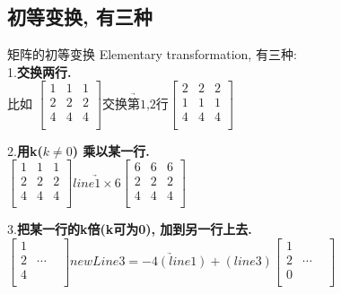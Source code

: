 \documentclass[UTF8]{ctexart}
\begin{document}
\subsection{初等变换, 有三种}

矩阵的初等变换 Elementary transformation, 有三种: \\

1.\textbf{交换两行.} \\
比如 $
\left[ \begin{matrix}
	1&		1&		1\\
	2&		2&		2\\
	4&		4&		4\\
\end{matrix} \right] \underrightarrow{\text{交换第1,2行}}\left[ \begin{matrix}
	2&		2&		2\\
	1&		1&		1\\
	4&		4&		4\\
\end{matrix} \right] 
$ \\
\vspace{1em} 

2.\textbf{用k($k \ne 0 $) 乘以某一行.} \\
$
\left[ \begin{matrix}
	1&		1&		1\\
	2&		2&		2\\
	4&		4&		4\\
\end{matrix} \right] \underrightarrow{line1 ×6}\left[ \begin{matrix}
	6&		6&		6\\
	2&		2&		2\\
	4&		4&		4\\
\end{matrix} \right] 
$ \\
\vspace{1em} 

3.\textbf{把某一行的k倍(k可为0), 加到另一行上去.} \\
$
\left[ \begin{matrix}
	1&		&		\\
	2&		\cdots&		\\
	4&		&		\\
\end{matrix} \right] \underrightarrow{newLine3=-4(line1)+(line3)}\left[ \begin{matrix}
	1&		&		\\
	2&		\cdots&		\\
	0&		&		\\
\end{matrix} \right] 
$\\
\vspace{1em} 
\end{document}
